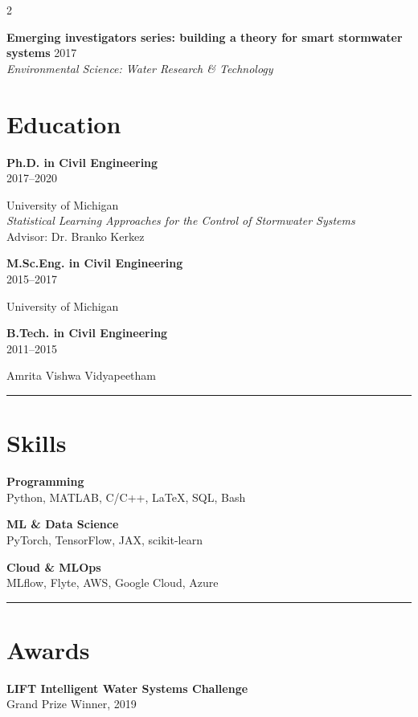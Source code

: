 \documentclass{article}
\newcommand{\degreeyear}[2]{
  {\textbf{#1}}\\
  {\small\textcolor{tuftegray}{#2}}
}
\newcommand{\divider}{\textcolor{tuftegray}{\rule{\linewidth}{0.5pt}}}
\newcommand{\publication}[3]{
  \textbf{#1} \hfill \textcolor{tuftegray}{#2}\\
  {\small\textit{#3}}\\[0.5em]
}
\begin{document}
\begin{paracol}{2}
\publication{Emerging investigators series: building a theory for smart stormwater systems}{2017}{Environmental Science: Water Research \& Technology}


\switchcolumn

\begin{flushleft}

\section{Education}
\vspace{0.5em}
\degreeyear{Ph.D. in Civil Engineering}{2017--2020}
University of Michigan\\
\vspace{0.2em}
{\small\textit{Statistical Learning Approaches for the Control of Stormwater Systems}}\\
{\small Advisor: Dr. Branko Kerkez}

\vspace{0.8em}
\degreeyear{M.Sc.Eng. in Civil Engineering}{2015--2017}
University of Michigan

\vspace{0.8em}
\degreeyear{B.Tech. in Civil Engineering}{2011--2015}
Amrita Vishwa Vidyapeetham
\vspace{1em}
\divider
\vspace{1em}

\section{Skills}
\vspace{0.5em}
\textbf{Programming}\\
{\small Python, MATLAB, C/C++, \LaTeX, SQL, Bash}
\vspace{0.8em}

\textbf{ML \& Data Science}\\
{\small PyTorch, TensorFlow, JAX, scikit-learn}
\vspace{0.8em}

\textbf{Cloud \& MLOps}\\
{\small MLflow, Flyte, AWS, Google Cloud, Azure}
\vspace{1em}
\divider
\vspace{1em}

\section{Awards}
\vspace{0.5em}
\textbf{LIFT Intelligent Water Systems Challenge}\\
{\small\textcolor{tuftegray}{Grand Prize Winner, 2019}}
\vspace{0.8em}


\end{flushleft}
\end{paracol}
\end{document}
